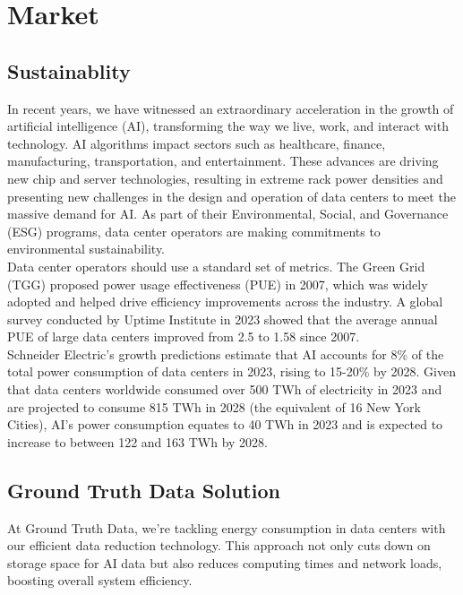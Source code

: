 \section{Market} \label{sec:sed-ultrices}

\subsection{Sustainablity}

In recent years, we have witnessed an extraordinary acceleration in the growth of artificial intelligence (AI), transforming the way we live, work, and interact with technology. AI algorithms impact sectors such as healthcare, finance, manufacturing, transportation, and entertainment. These advances are driving new chip and server technologies, resulting in extreme rack power densities and presenting new challenges in the design and operation of data centers to meet the massive demand for AI. As part of their Environmental, Social, and Governance (ESG) programs, data center operators are making commitments to environmental sustainability.\\

Data center operators should use a standard set of metrics. The Green Grid (TGG) proposed power usage effectiveness (PUE) in 2007, which was widely adopted and helped drive efficiency improvements across the industry. A global survey conducted by Uptime Institute in 2023 showed that the average annual PUE of large data centers improved from 2.5 to 1.58 since 2007.\\

Schneider Electric's growth predictions estimate that AI accounts for 8\% of the total power consumption of data centers in 2023, rising to 15-20\% by 2028. Given that data centers worldwide consumed over 500 TWh of electricity in 2023 and are projected to consume 815 TWh in 2028 (the equivalent of 16 New York Cities), AI's power consumption equates to 40 TWh in 2023 and is expected to increase to between 122 and 163 TWh by 2028.


\subsection{Ground Truth Data Solution}

At Ground Truth Data, we're tackling energy consumption in data centers with our efficient data reduction technology. This approach not only cuts down on storage space for AI data but also reduces computing times and network loads, boosting overall system efficiency.\\

